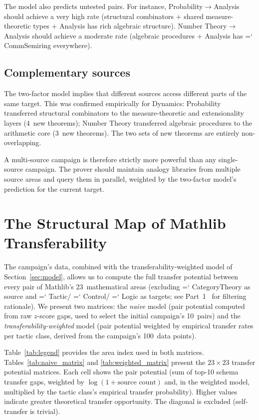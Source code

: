 \documentclass[11pt]{article}
\renewcommand{\texttt}[1]{%
  \begingroup\ttfamily\hyphenchar\font=`\-\relax
  \def\_{\textunderscore\discretionary{}{}{}}%
  #1\endgroup}
\theoremstyle{definition}
\theoremstyle{remark}
\begin{document}
The model also predicts untested pairs.  For instance,
Probability$\to$Analysis should achieve a very high rate (structural
combinators + shared measure-theoretic types + Analysis has rich
algebraic structure).  Number Theory$\to$Analysis should achieve a
moderate rate (algebraic procedures + Analysis has
\texttt{CommSemiring} everywhere).

\subsection{Complementary sources}

The two-factor model implies that different sources access
different parts of the same target.  This was confirmed empirically
for Dynamics: Probability transferred structural combinators to the
measure-theoretic and extensionality layers (4~new theorems);
Number Theory transferred algebraic procedures to the arithmetic
core (3~new theorems).  The two sets of new theorems are entirely
non-overlapping.

A multi-source campaign is therefore strictly more powerful than any
single-source campaign.  The prover should maintain analogy
libraries from multiple source areas and query them in parallel,
weighted by the two-factor model's prediction for the current
target.

\section{The Structural Map of Mathlib Transferability}%
\label{sec:map}

The campaign's data, combined with the transferability-weighted
model of Section~\ref{sec:model}, allows us to compute the full
transfer potential between every pair of Mathlib's 23~mathematical
areas (excluding \texttt{CategoryTheory} as source and
\texttt{Tactic}/\texttt{Control}/\texttt{Logic} as targets;
see Part~1~\cite{yanasse_part1} for filtering rationale).  We present two matrices:
the \emph{naive} model (pair potential computed from raw $z$-score
gaps, used to select the initial campaign's 10~pairs) and the
\emph{transferability-weighted} model (pair potential weighted by
empirical transfer rates per tactic class, derived from the
campaign's 100~data points).

Table~\ref{tab:legend} provides the area index used in both
matrices.  Tables~\ref{tab:naive_matrix} and
\ref{tab:weighted_matrix} present the $23 \times 23$ transfer
potential matrices.  Each cell shows the pair potential (sum of
top-10 schema transfer gaps, weighted by $\log(1 + \text{source
count})$ and, in the weighted model, multiplied by the tactic
class's empirical transfer probability).  Higher values indicate
greater theoretical transfer opportunity.  The diagonal is
excluded (self-transfer is trivial).
\end{document}
